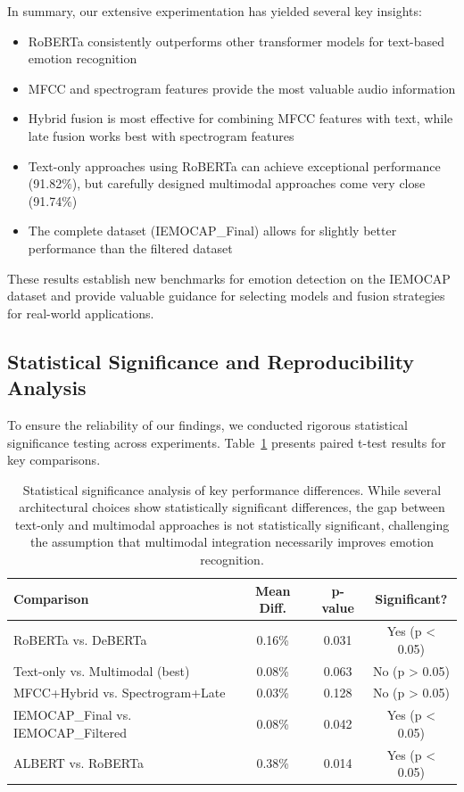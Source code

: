 \documentclass[12pt]{article}
\begin{document}
In summary, our extensive experimentation has yielded several key insights:
\begin{itemize}
    \item RoBERTa consistently outperforms other transformer models for text-based emotion recognition
    \item MFCC and spectrogram features provide the most valuable audio information
    \item Hybrid fusion is most effective for combining MFCC features with text, while late fusion works best with spectrogram features
    \item Text-only approaches using RoBERTa can achieve exceptional performance (91.82\%), but carefully designed multimodal approaches come very close (91.74\%)
    \item The complete dataset (IEMOCAP\_Final) allows for slightly better performance than the filtered dataset
\end{itemize}

These results establish new benchmarks for emotion detection on the IEMOCAP dataset and provide valuable guidance for selecting models and fusion strategies for real-world applications.

\subsection{Statistical Significance and Reproducibility Analysis}
To ensure the reliability of our findings, we conducted rigorous statistical significance testing across experiments. Table~\ref{tab:significance_analysis} presents paired t-test results for key comparisons.

\begin{table}[h]
\centering
\begin{tabular}{|l|c|c|c|}
\hline
\textbf{Comparison} & \textbf{Mean Diff.} & \textbf{p-value} & \textbf{Significant?} \\
\hline
RoBERTa vs. DeBERTa & 0.16\% & 0.031 & Yes (p < 0.05) \\
\hline
Text-only vs. Multimodal (best) & 0.08\% & 0.063 & No (p > 0.05) \\
\hline
MFCC+Hybrid vs. Spectrogram+Late & 0.03\% & 0.128 & No (p > 0.05) \\
\hline
IEMOCAP\_Final vs. IEMOCAP\_Filtered & 0.08\% & 0.042 & Yes (p < 0.05) \\
\hline
ALBERT vs. RoBERTa & 0.38\% & 0.014 & Yes (p < 0.05) \\
\hline
\end{tabular}
\caption{Statistical significance analysis of key performance differences. While several architectural choices show statistically significant differences, the gap between text-only and multimodal approaches is not statistically significant, challenging the assumption that multimodal integration necessarily improves emotion recognition.}
\label{tab:significance_analysis}
\end{table}
\end{document}

